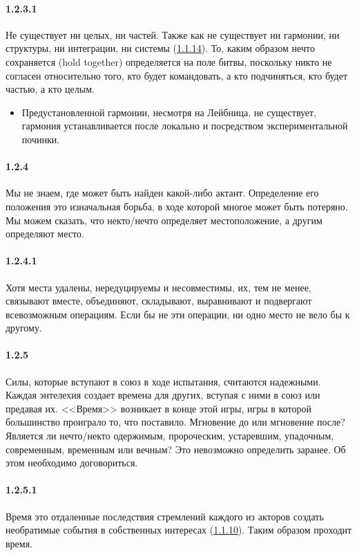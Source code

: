 \paragraph{1.2.3.1}\hypertarget{par:1.2.3.1}{} Не существует ни целых, ни частей. Также как не существует ни гармонии, ни структуры, ни интеграции, ни системы (\hyperlink{par:1.1.14}{1.1.14}). То, каким образом нечто сохраняется
(hold together) определяется на поле битвы, поскольку никто не согласен относительно того, кто будет командовать, а кто подчиняться, кто будет частью, а кто целым. 
	\begin{itemize}
	\item Предустановленной гармонии, несмотря на Лейбница, не существует, гармония устанавливается после локально и посредством экспериментальной починки.
	\end{itemize}

\paragraph{1.2.4}\hypertarget{par:1.2.4}{} Мы не знаем, где может быть найден какой-либо актант. Определение его положения это изначальная борьба, в ходе которой многое может быть потеряно. Мы можем сказать, что некто/нечто определяет местоположение, а другим определяют место.

\paragraph{1.2.4.1}\hypertarget{par:1.2.4.1}{} Хотя места удалены, нередуцируемы и несовместимы, их, тем не менее, связывают
вместе, объединяют, складывают, выравнивают и подвергают всевозможным
операциям. Если бы не эти операции, ни одно место не вело бы к другому.

\paragraph{1.2.5}\hypertarget{par:1.2.5}{} Силы, которые вступают в союз в ходе испытания, считаются надежными. Каждая энтелехия создает времена для других, вступая с ними в союз или предавая их. <<Время>> возникает в конце этой игры, игры в которой большинство проиграло то, что поставило.
Мгновение до или мгновение после? Является ли нечто/некто одержимым, пророческим, устаревшим, упадочным, современным, временным или вечным? Это невозможно определить заранее. Об этом необходимо договориться.

\paragraph{1.2.5.1}\hypertarget{par:1.2.5.1}{} Время это отдаленные последствия стремлений каждого из акторов создать необратимые события в собственных интересах (\hyperlink{par:1.1.10}{1.1.10}). Таким образом проходит время.

